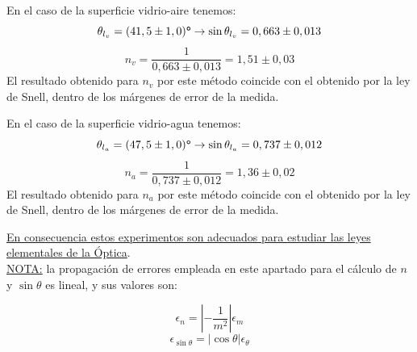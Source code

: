 \documentclass[a4paper,twocolumn]{article}
\begin{document}
\begin{itemize}
        En el caso de la superficie vidrio-aire tenemos:
        $$ \theta_{l_v} = (41,5 \pm 1,0) \textbf{\textdegree} \rightarrow \sin \theta_{l_v} = 0,663 \pm 0,013 $$
        $$ n_v = \frac{1}{0,663 \pm 0,013} = 1,51 \pm 0,03 $$
        El resultado obtenido para $n_v$ por este método coincide con el obtenido por la ley de Snell, dentro de los márgenes de error de la medida.

        En el caso de la superficie vidrio-agua tenemos:
        $$ \theta_{l_a} = (47,5 \pm 1,0) \textbf{\textdegree} \rightarrow \sin \theta_{l_a} = 0,737 \pm 0,012 $$
        $$ n_a = \frac{1}{0,737 \pm 0,012} = 1,36 \pm 0,02 $$
        El resultado obtenido para $n_a$ por este método coincide con el obtenido por la ley de Snell, dentro de los márgenes de error de la medida.      

        

    \end{itemize}

    \ul{En consecuencia estos experimentos son adecuados para estudiar las leyes elementales de la \'Optica}.\\

    \underline{NOTA:} la propagación de errores empleada en este apartado para el cálculo de $n$ y $\sin \theta$ es lineal, y sus valores son:

    $$ \epsilon_n = \left| - \frac{1}{m^2} \right| \epsilon_m $$
    $$ \epsilon_{\sin \theta} = | \cos \theta | \epsilon_{\theta} $$
 
	
	
    

    	
	
	
	
\end{document}
